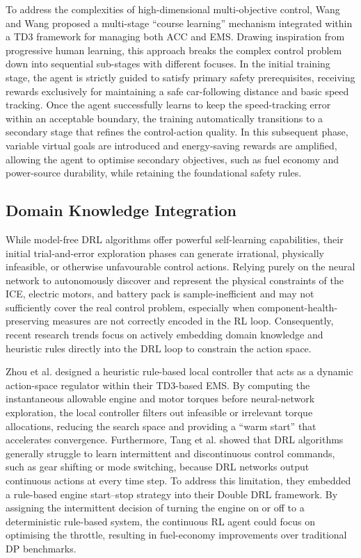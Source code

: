 To address the complexities of high-dimensional multi-objective control, Wang and Wang \cite{wang_energy_2025} proposed a multi-stage ``course learning'' mechanism integrated within a \ac{TD3} framework for managing both \ac{ACC} and \ac{EMS}. Drawing inspiration from progressive human learning, this approach breaks the complex control problem down into sequential sub-stages with different focuses. In the initial training stage, the agent is strictly guided to satisfy primary safety prerequisites, receiving rewards exclusively for maintaining a safe car-following distance and basic speed tracking. Once the agent successfully learns to keep the speed-tracking error within an acceptable boundary, the training automatically transitions to a secondary stage that refines the control-action quality. In this subsequent phase, variable virtual goals are introduced and energy-saving rewards are amplified, allowing the agent to optimise secondary objectives, such as fuel economy and power-source durability, while retaining the foundational safety rules.

\subsection{Domain Knowledge Integration}
While model-free \ac{DRL} algorithms offer powerful self-learning capabilities, their initial trial-and-error exploration phases can generate irrational, physically infeasible, or otherwise unfavourable control actions. Relying purely on the neural network to autonomously discover and represent the physical constraints of the \ac{ICE}, electric motors, and battery pack is sample-inefficient and may not sufficiently cover the real control problem, especially when component-health-preserving measures are not correctly encoded in the \ac{RL} loop. Consequently, recent research trends focus on actively embedding domain knowledge and heuristic rules directly into the \ac{DRL} loop to constrain the action space.

Zhou et al. \cite{zhou_novel_2021} designed a heuristic rule-based local controller that acts as a dynamic action-space regulator within their \ac{TD3}-based \ac{EMS}. By computing the instantaneous allowable engine and motor torques before neural-network exploration, the local controller filters out infeasible or irrelevant torque allocations, reducing the search space and providing a ``warm start'' that accelerates convergence. Furthermore, Tang et al. \cite{tang_double_2022} showed that \ac{DRL} algorithms generally struggle to learn intermittent and discontinuous control commands, such as gear shifting or mode switching, because \ac{DRL} networks output continuous actions at every time step. To address this limitation, they embedded a rule-based engine start--stop strategy into their Double \ac{DRL} framework. By assigning the intermittent decision of turning the engine on or off to a deterministic rule-based system, the continuous \ac{RL} agent could focus on optimising the throttle, resulting in fuel-economy improvements over traditional \ac{DP} benchmarks.
